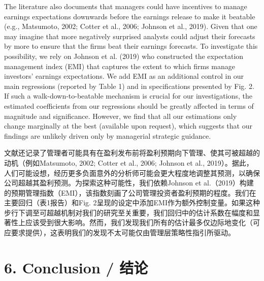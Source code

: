 \documentclass[12pt,a4paper]{article}
\newenvironment{original}
  {\par\medskip\noindent\ignorespaces}
  {\par\medskip}
\newenvironment{translation}
  {\par\noindent{\color{transblue}\ignorespaces}}
  {\par\bigskip}
\begin{document}
\begin{original}
The literature also documents that managers could have incentives to manage earnings expectations downwards before the earnings release to make it beatable (e.g., Matsumoto, 2002; Cotter et al., 2006; Johnson et al., 2019). Given that one may imagine that more negatively surprised analysts could adjust their forecasts by more to ensure that the firms beat their earnings forecasts. To investigate this possibility, we rely on Johnson et al. (2019) who constructed the expectation management index (EMI) that captures the extent to which firms manage investors' earnings expectations. We add EMI as an additional control in our main regressions (reported by Table 1) and in specifications presented by Fig. 2. If such a walk-down-to-beatable mechanism is crucial for our investigations, the estimated coefficients from our regressions should be greatly affected in terms of magnitude and significance. However, we find that all our estimations only change marginally at the best (available upon request), which suggests that our findings are unlikely driven only by managerial strategic guidance.
\end{original}
\begin{translation}
文献还记录了管理者可能具有在盈利发布前将盈利预期向下管理、使其可被超越的动机（例如Matsumoto, 2002; Cotter et al., 2006; Johnson et al., 2019）。据此，人们可能设想，经历更多负面意外的分析师可能会更大程度地调整其预测，以确保公司超越其盈利预测。为探索这种可能性，我们依赖Johnson et al.（2019）构建的预期管理指数（EMI），该指数刻画了公司管理投资者盈利预期的程度。我们在主要回归（表1报告）和Fig. 2呈现的设定中添加EMI作为额外控制变量。如果这种步行下调至可超越机制对我们的研究至关重要，我们回归中的估计系数在幅度和显著性上应该受到很大影响。然而，我们发现我们所有的估计最多仅边际地变化（可应要求提供），这表明我们的发现不太可能仅由管理层策略性指引所驱动。
\end{translation}

\newpage
\section{6. Conclusion / 结论}
\end{document}
